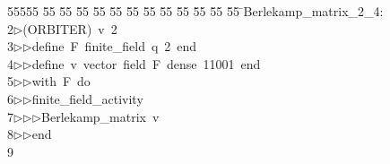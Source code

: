 %
%
\begin{tabbing}
55555 \= 55 \= 55 \= 55 \= 55 \= 55 \= 55 \= 55 \= 55 \= 55 \= 55 \= 55 \= 55 \= \>Berlekamp\_matrix\_2\_4:\\[0pt]
2\>$\triangleright$\>(ORBITER)\ v\ 2\ \\[0pt]
3\>$\triangleright$\>$\triangleright$\>define\ F\ finite\_field\ q\ 2\ end\ \\[0pt]
4\>$\triangleright$\>$\triangleright$\>define\ v\ vector\ field\ F\ dense\ 11001\ end\ \\[0pt]
5\>$\triangleright$\>$\triangleright$\>with\ F\ do\ \\[0pt]
6\>$\triangleright$\>$\triangleright$\>finite\_field\_activity\ \\[0pt]
7\>$\triangleright$\>$\triangleright$\>$\triangleright$\>Berlekamp\_matrix\ v\ \\[0pt]
8\>$\triangleright$\>$\triangleright$\>end\\[0pt]
9\>\end{tabbing}
